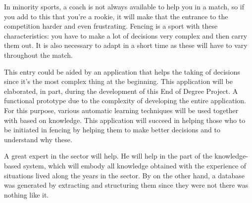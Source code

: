In minority sports, a coach is not always available to help you
in a match, so if you add to this that you're a rookie, it will make
that the entrance to the competition harder and even frustrating. Fencing
is a sport with these characteristics: you have to make a lot of decisions
very complex and then carry them out. It is also necessary to adapt in a short time
as these will have to vary throughout the match.


This entry could be aided by an application that helps the taking
of decisions since it's the most complex thing at the beginning. This application will be elaborated,
in part, during the development of this End of Degree Project. A
functional prototype due to the complexity of developing the entire application.
For this purpose, various automatic learning techniques will be used together with
based on knowledge. This application will succeed in helping those who
to be initiated in fencing by helping them to make better decisions and to understand
why these.

A great expert in the sector will help. He will help
in the part of the knowledge-based system, which will embody all knowledge
obtained with the experience of situations lived along the years in the sector. By
on the other hand, a database was generated by extracting and structuring them since they were not
there was nothing like it.